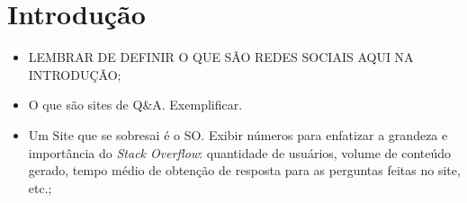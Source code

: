\chapter{Introdução}
    \begin{itemize}
        \item LEMBRAR DE DEFINIR O QUE SÃO REDES SOCIAIS AQUI NA INTRODUÇÃO;
        \item O que são sites de Q\&A. Exemplificar.
        \item Um Site que se sobresai é o SO. Exibir números para enfatizar a grandeza e importância do \textit{Stack Overflow}: quantidade de usuários, volume de conteúdo gerado, tempo médio de obtenção de resposta para as perguntas feitas no site, etc.; 


\end{itemize}
